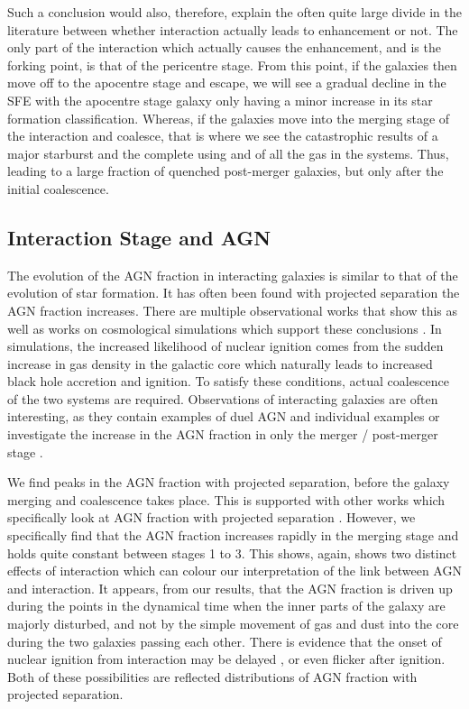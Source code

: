 Such a conclusion would also, therefore, explain the often quite large divide in the literature between whether interaction actually leads to enhancement or not. The only part of the interaction which actually causes the enhancement, and is the forking point, is that of the pericentre stage. From this point, if the galaxies then move off to the apocentre stage and escape, we will see a gradual decline in the SFE with the apocentre stage galaxy only having a minor increase in its star formation classification. Whereas, if the galaxies move into the merging stage of the interaction and coalesce, that is where we see the catastrophic results of a major starburst and the complete using and of all the gas in the systems. Thus, leading to a large fraction of quenched post-merger galaxies, but only after the initial coalescence. 

\subsection{Interaction Stage and AGN}
\noindent The evolution of the AGN fraction in interacting galaxies is similar to that of the evolution of star formation. It has often been found with projected separation the AGN fraction increases. There are multiple observational works that show this \citep{2007MNRAS.375.1017A, 2013MNRAS.435.3627E, 2020ApJ...904..107S} as well as works on cosmological simulations which support these conclusions \citep{2023MNRAS.519.4966B}. In simulations, the increased likelihood of nuclear ignition comes from the sudden increase in gas density in the galactic core which naturally leads to increased black hole accretion and ignition. To satisfy these conditions, actual coalescence of the two systems are required. Observations of interacting galaxies are often interesting, as they contain examples of duel AGN and individual examples \citep[e.g.][]{2017MNRAS.470L..49E, 2021ApJ...923...36S} or investigate the increase in the AGN fraction in only the merger / post-merger stage \citep{2020A&A...637A..94G}.

We find peaks in the AGN fraction with projected separation, before the galaxy merging and coalescence takes place. This is supported with other works which specifically look at AGN fraction with projected separation \citep{2011MNRAS.418.2043E, 2023ApJ...942..107S}. However, we specifically find that the AGN fraction increases rapidly in the merging stage and holds quite constant between stages 1 to 3. This shows, again, shows two distinct effects of interaction which can colour our interpretation of the link between AGN and interaction. It appears, from our results, that the AGN fraction is driven up during the points in the dynamical time when the inner parts of the galaxy are majorly disturbed, and not by the simple movement of gas and dust into the core during the two galaxies passing each other. There is evidence that the onset of nuclear ignition from interaction may be delayed \citep{2011MNRAS.418.2043E}, or even flicker \citep{2015MNRAS.451.2517S} after ignition. Both of these possibilities are reflected distributions of AGN fraction with projected separation.

